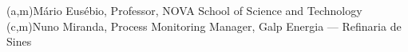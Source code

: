 %
%
%
%
(a,m){Mário Eusébio, Professor, NOVA School of Science and Technology}
(c,m){Nuno Miranda, Process Monitoring Manager, Galp Energia --- Refinaria de Sines}



%
%
%
%
